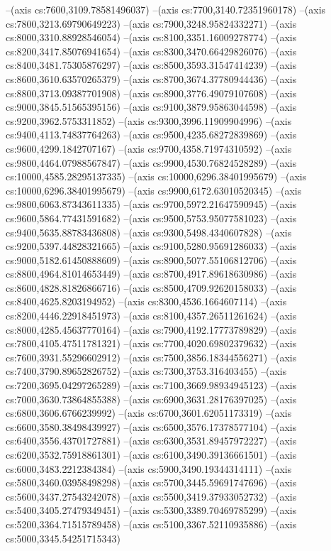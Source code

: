 --(axis cs:7600,3109.78581496037)
--(axis cs:7700,3140.72351960178)
--(axis cs:7800,3213.69790649223)
--(axis cs:7900,3248.95824332271)
--(axis cs:8000,3310.88928546054)
--(axis cs:8100,3351.16009278774)
--(axis cs:8200,3417.85076941654)
--(axis cs:8300,3470.66429826076)
--(axis cs:8400,3481.75305876297)
--(axis cs:8500,3593.31547414239)
--(axis cs:8600,3610.63570265379)
--(axis cs:8700,3674.37780944436)
--(axis cs:8800,3713.09387701908)
--(axis cs:8900,3776.49079107608)
--(axis cs:9000,3845.51565395156)
--(axis cs:9100,3879.95863044598)
--(axis cs:9200,3962.5753311852)
--(axis cs:9300,3996.11909904996)
--(axis cs:9400,4113.74837764263)
--(axis cs:9500,4235.68272839869)
--(axis cs:9600,4299.1842707167)
--(axis cs:9700,4358.71974310592)
--(axis cs:9800,4464.07988567847)
--(axis cs:9900,4530.76824528289)
--(axis cs:10000,4585.28295137335)
--(axis cs:10000,6296.38401995679)
--(axis cs:10000,6296.38401995679)
--(axis cs:9900,6172.63010520345)
--(axis cs:9800,6063.87343611335)
--(axis cs:9700,5972.21647590945)
--(axis cs:9600,5864.77431591682)
--(axis cs:9500,5753.95077581023)
--(axis cs:9400,5635.88783436808)
--(axis cs:9300,5498.4340607828)
--(axis cs:9200,5397.44828321665)
--(axis cs:9100,5280.95691286033)
--(axis cs:9000,5182.61450888609)
--(axis cs:8900,5077.55106812706)
--(axis cs:8800,4964.81014653449)
--(axis cs:8700,4917.89618630986)
--(axis cs:8600,4828.81826866716)
--(axis cs:8500,4709.92620158033)
--(axis cs:8400,4625.8203194952)
--(axis cs:8300,4536.1664607114)
--(axis cs:8200,4446.22918451973)
--(axis cs:8100,4357.26511261624)
--(axis cs:8000,4285.45637770164)
--(axis cs:7900,4192.17773789829)
--(axis cs:7800,4105.47511781321)
--(axis cs:7700,4020.69802379632)
--(axis cs:7600,3931.55296602912)
--(axis cs:7500,3856.18344556271)
--(axis cs:7400,3790.89652826752)
--(axis cs:7300,3753.316403455)
--(axis cs:7200,3695.04297265289)
--(axis cs:7100,3669.98934945123)
--(axis cs:7000,3630.73864855388)
--(axis cs:6900,3631.28176397025)
--(axis cs:6800,3606.6766239992)
--(axis cs:6700,3601.62051173319)
--(axis cs:6600,3580.38498439927)
--(axis cs:6500,3576.17378577104)
--(axis cs:6400,3556.43701727881)
--(axis cs:6300,3531.89457972227)
--(axis cs:6200,3532.75918861301)
--(axis cs:6100,3490.39136661501)
--(axis cs:6000,3483.2212384384)
--(axis cs:5900,3490.19344314111)
--(axis cs:5800,3460.03958498298)
--(axis cs:5700,3445.59691747696)
--(axis cs:5600,3437.27543242078)
--(axis cs:5500,3419.37933052732)
--(axis cs:5400,3405.27479349451)
--(axis cs:5300,3389.70469785299)
--(axis cs:5200,3364.71515789458)
--(axis cs:5100,3367.52110935886)
--(axis cs:5000,3345.54251715343)
